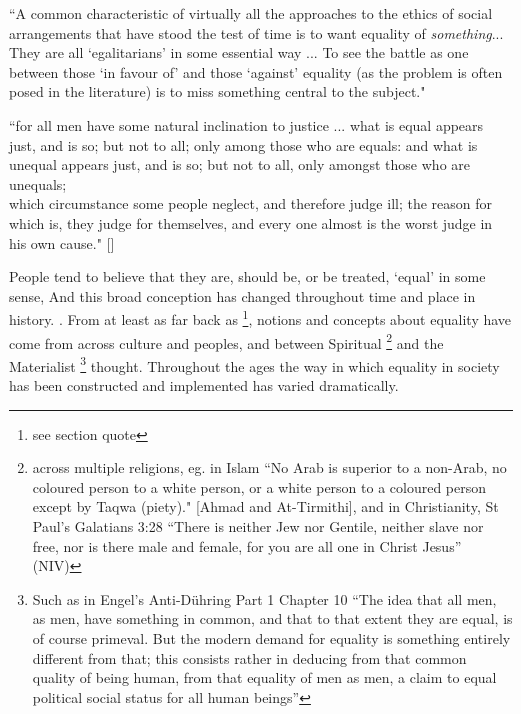 \begin{displayquote}
``A common characteristic of virtually all the approaches to the ethics of social arrangements that have stood the test of time is to want equality of \textit{something}... They are all `egalitarians' in some essential way ... To see the battle as one between those `in favour of' and those `against' equality (as the problem is often posed in the literature) is to miss something central to the subject."\cite[Chapter 1]{18084} 
\end{displayquote}

\begin{displayquote}
``for all men have some natural inclination to justice ... what is equal appears just, and is so; but not to all; only among those who are equals: and what is unequal appears just, and is so; but not to all, only amongst those who are unequals;\\
which circumstance some people neglect, and therefore judge ill; the reason for which is, they judge for themselves, and every one almost is the worst judge in his own cause." [\citeauthor[Politics, chapter III.9]{AristotleGutenberg}]
\end{displayquote}


People tend to believe that they are, should be, or be treated, `equal' in some sense, 
And this broad conception has changed throughout time and place in history. \citep{themeaningofequalitycapaldi}.
From at least as far back as \citeauthor{AristotleGutenberg}\footnote{see section quote}, notions and concepts about equality have come from across culture and peoples, and between Spiritual \footnote{across multiple religions, eg. in Islam ``No Arab is superior to a non-Arab, no coloured person to a  white person, or a white person to a coloured person except by Taqwa (piety)." [Ahmad and At-Tirmithi], and in Christianity, St Paul's Galatians 3:28 ``There is neither Jew nor Gentile, neither slave nor free, nor is there male and female, for you are all one in Christ Jesus'' (NIV) } and the Materialist \footnote{Such as in Engel's Anti-D\"{u}hring Part 1 Chapter 10 ``The idea that all men, as men, have something in common, and that to that extent they are equal, is of course primeval. But the modern demand for equality is something entirely different from that; this consists rather in deducing from that common quality of being human, from that equality of men as men, a claim to equal political social status for all human beings''} thought.
Throughout the ages the way in which equality in society has been constructed and implemented has varied dramatically.%


